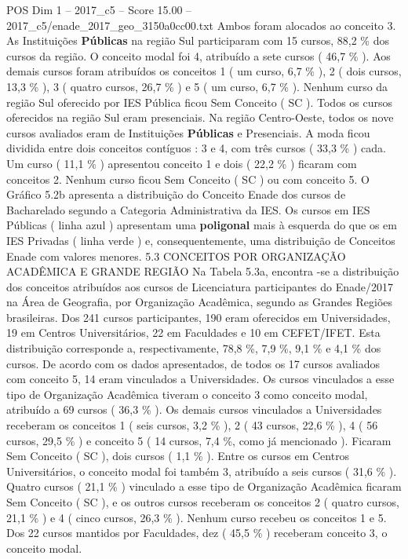 \begin{textsample}{POS Dim 1 – 2017\_c5 – Score 15.00 – 2017\_c5/enade\_2017\_geo\_3150a0cc00.txt}
Ambos foram alocados ao conceito 3.
As Instituições \textbf{Públicas} na região Sul participaram com 15 cursos, 88,2 \% dos cursos da região.
O conceito modal foi 4, atribuído a sete cursos ( 46,7 \% ).
Aos demais cursos foram atribuídos os conceitos 1 ( um curso, 6,7 \% ), 2 ( dois cursos, 13,3 \% ), 3 ( quatro cursos, 26,7 \% ) e 5 ( um curso, 6,7 \% ).
Nenhum curso da região Sul oferecido por IES Pública ficou Sem Conceito ( SC ).
Todos os cursos oferecidos na região Sul eram presenciais.
Na região Centro-Oeste, todos os nove cursos avaliados eram de Instituições \textbf{Públicas} e Presenciais.
A moda ficou dividida entre dois conceitos contíguos : 3 e 4, com três cursos ( 33,3 \% ) cada.
Um curso ( 11,1 \% ) apresentou conceito 1 e dois ( 22,2 \% ) ficaram com conceitos 2.
Nenhum curso ficou Sem Conceito ( SC ) ou com conceito 5.
O Gráfico 5.2b apresenta a distribuição do Conceito Enade dos cursos de Bacharelado segundo a Categoria Administrativa da IES.
Os cursos em IES Públicas ( linha azul ) apresentam uma \textbf{poligonal} mais à esquerda do que os em IES Privadas ( linha verde ) e, consequentemente, uma distribuição de Conceitos Enade com valores menores. 5.3 CONCEITOS POR ORGANIZAÇÃO ACADÊMICA E GRANDE REGIÃO Na Tabela 5.3a, encontra -se a distribuição dos conceitos atribuídos aos cursos de Licenciatura participantes do Enade/2017 na Área de Geografia, por Organização Acadêmica, segundo as Grandes Regiões brasileiras.
Dos 241 cursos participantes, 190 eram oferecidos em Universidades, 19 em Centros Universitários, 22 em Faculdades e 10 em CEFET/IFET.
Esta distribuição corresponde a, respectivamente, 78,8 \%, 7,9 \%, 9,1 \% e 4,1 \% dos cursos.
De acordo com os dados apresentados, de todos os 17 cursos avaliados com conceito 5, 14 eram vinculados a Universidades.
Os cursos vinculados a esse tipo de Organização Acadêmica tiveram o conceito 3 como conceito modal, atribuído a 69 cursos ( 36,3 \% ).
Os demais cursos vinculados a Universidades receberam os conceitos 1 ( seis cursos, 3,2 \% ), 2 ( 43 cursos, 22,6 \% ), 4 ( 56 cursos, 29,5 \% ) e conceito 5 ( 14 cursos, 7,4 \%, como já mencionado ).
Ficaram Sem Conceito ( SC ), dois cursos ( 1,1 \% ).
Entre os cursos em Centros Universitários, o conceito modal foi também 3, atribuído a seis cursos ( 31,6 \% ).
Quatro cursos ( 21,1 \% ) vinculado a esse tipo de Organização Acadêmica ficaram Sem Conceito ( SC ), e os outros cursos receberam os conceitos 2 ( quatro cursos, 21,1 \% ) e 4 ( cinco cursos, 26,3 \% ).
Nenhum curso recebeu os conceitos 1 e 5.
Dos 22 cursos mantidos por Faculdades, dez ( 45,5 \% ) receberam conceito 3, o conceito modal.

\end{textsample}
